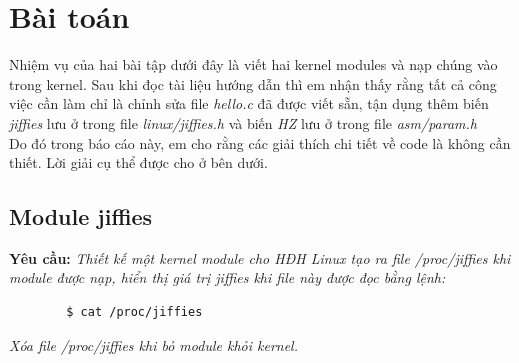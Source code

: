 \documentclass{article}
\begin{document}
\section{Bài toán}
Nhiệm vụ của hai bài tập dưới đây là viết hai kernel modules và nạp chúng vào trong kernel. Sau khi đọc tài liệu hướng dẫn thì em nhận thấy rằng tất cả công việc cần làm chỉ là chỉnh sửa file \textit{hello.c} đã được viết sẵn,
tận dụng thêm biến \textit{jiffies} lưu ở trong file \textit{linux/jiffies.h} và biến \textit{HZ} lưu ở trong file \textit{asm/param.h}
\\

Do đó trong báo cáo này, em cho rằng các giải thích chi tiết về code là không cần thiết. Lời giải cụ thể được cho ở bên dưới.
\subsection{Module jiffies}
\textbf{Yêu cầu: }\textit{Thiết kế một kernel module cho HĐH Linux tạo ra file /proc/jiffies khi module được nạp, hiển thị giá trị jiffies khi file này được đọc bằng lệnh:}
\begin{verbatim}
        $ cat /proc/jiffies
 \end{verbatim}

\textit{Xóa file /proc/jiffies khi bỏ module khỏi kernel.}
\end{document}
